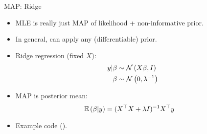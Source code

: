 \begin{frame}{MAP: Ridge}
\begin{itemize}
    \item MLE is really just MAP of likelihood + non-informative prior.
    \item In general, can apply any (differentiable) prior.
    \item Ridge regression (fixed $X$): 
    \begin{align*}
        y | \beta &\sim \operatorname{\mathcal{N}}\left(X\beta, I\right) \\
        \beta &\sim \operatorname{\mathcal{N}}\left(0, \lambda^{-1}\right)
    \end{align*}
    \item MAP is posterior mean:
    \begin{align*}
        \mathbb{E}\left(\beta | y\right)
        &=
        (X^\top X + \lambda I)^{-1} X^\top y
    \end{align*}
    \item Example code ().
\end{itemize} 
\end{frame}